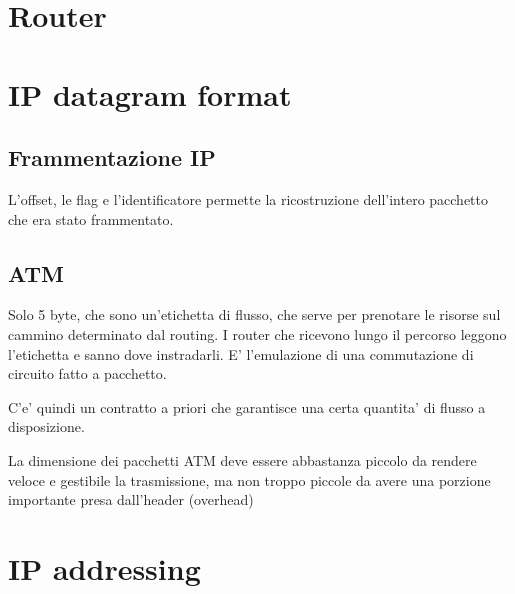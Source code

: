 \section{Router}

\section{IP datagram format}

\subsection{Frammentazione IP}

L'offset, le flag e l'identificatore permette la ricostruzione dell'intero pacchetto che era stato frammentato.


\subsection{ATM}

Solo 5 byte, che sono un'etichetta di flusso, che serve per prenotare le risorse sul cammino determinato dal routing. I router che ricevono lungo il percorso leggono l'etichetta e sanno dove instradarli. E' l'emulazione di una commutazione di circuito fatto a pacchetto.

C'e' quindi un contratto a priori che garantisce una certa quantita' di flusso a disposizione.

La dimensione dei pacchetti ATM deve essere abbastanza piccolo da rendere veloce e gestibile la trasmissione, ma non troppo piccole da avere una porzione importante presa dall'header (overhead)

\section{IP addressing}

